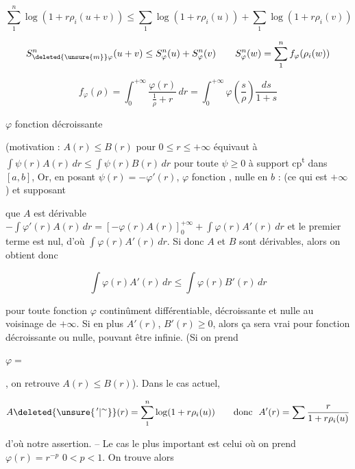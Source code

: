 \[
\sum_1^n\log(1+r\rho_i(u+v))\leq\sum_1\log(1+r\rho_i(u))+\sum_1\log(1+r\rho_i(v))
\]

\[
S_{\deleted{\unsure{m}}\varphi}^{n}(u+v)\leq S_\varphi^n(u)+S_\varphi^n(v)\qquad S_\varphi^n(w)=\sum_1^n f_\varphi(\rho_i(w))
\]

\[
f_\varphi(\rho)=\int_0^{+\infty}\frac{\varphi(r)}{\frac1\rho+r}\,dr=\int_0^{+\infty}\varphi\left(\frac s\rho\right)\frac{ds}{1+s}
\]

$\varphi$ fonction décroissante

(motivation :  $A(r)\leq B(r)$ pour $0\leq r\leq+\infty$ équivaut à $\int\psi(r)A(r)\,dr\leq\int\psi(r)B(r)\,dr$ pour toute $\psi\geq0$ à support cp\textsuperscript{t} dans $[a,b]$, Or, en posant $\psi(r)=-\varphi'(r)$, $\varphi$ fonction  , nulle en $b$ :    (ce qui est $+\infty$) et supposant 

que $A$ est dérivable $-\int\varphi'(r)A(r)\,dr=[-\varphi(r)A(r)]_0^{+\infty}+\int\varphi(r)A'(r)\,dr$ et le premier terme est nul, d'où $\int\varphi(r)A'(r)\,dr$. Si donc $A$ et $B$ sont dérivables, alors on obtient donc

\[
\int\varphi(r)A'(r)\,dr\leq\int\varphi(r)B'(r)\,dr
\]

pour toute fonction $\varphi$ continûment différentiable, décroissante \inserted{sur $[0,+\infty[$} et nulle au voisinage de $+\infty$. Si en plus $A'(r)$, $B'(r)\geq0$, alors ça sera vrai pour  fonction décroissante  ou nulle, pouvant être infinie. (Si on prend

$\varphi=$


, on retrouve $A(r)\leq B(r)$). Dans le cas actuel,

\[
A\deleted{\unsure{^{\,\prime}|{}^{\sim}}}(r)=\sum_1^n\log(1+r\rho_i(u))\qquad \text{donc }\ A'(r)=\sum\frac{r}{1+r\rho_i(u)}
\]

d'où notre assertion. -- Le cas le plus important est celui où on prend $\varphi(r)=r^{-p}$ $0<p<1$. On trouve alors

